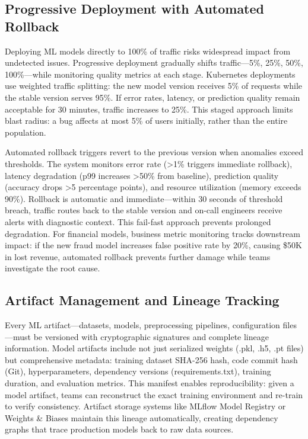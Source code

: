 \subsection{Progressive Deployment with Automated Rollback}

Deploying ML models directly to 100\% of traffic risks widespread impact from undetected issues. Progressive deployment gradually shifts traffic---5\%, 25\%, 50\%, 100\%---while monitoring quality metrics at each stage. Kubernetes deployments use weighted traffic splitting: the new model version receives 5\% of requests while the stable version serves 95\%. If error rates, latency, or prediction quality remain acceptable for 30 minutes, traffic increases to 25\%. This staged approach limits blast radius: a bug affects at most 5\% of users initially, rather than the entire population.

Automated rollback triggers revert to the previous version when anomalies exceed thresholds. The system monitors error rate (>1\% triggers immediate rollback), latency degradation (p99 increases >50\% from baseline), prediction quality (accuracy drops >5 percentage points), and resource utilization (memory exceeds 90\%). Rollback is automatic and immediate---within 30 seconds of threshold breach, traffic routes back to the stable version and on-call engineers receive alerts with diagnostic context. This fail-fast approach prevents prolonged degradation. For financial models, business metric monitoring tracks downstream impact: if the new fraud model increases false positive rate by 20\%, causing \$50K in lost revenue, automated rollback prevents further damage while teams investigate the root cause.

\subsection{Artifact Management and Lineage Tracking}

Every ML artifact---datasets, models, preprocessing pipelines, configuration files---must be versioned with cryptographic signatures and complete lineage information. Model artifacts include not just serialized weights (.pkl, .h5, .pt files) but comprehensive metadata: training dataset SHA-256 hash, code commit hash (Git), hyperparameters, dependency versions (requirements.txt), training duration, and evaluation metrics. This manifest enables reproducibility: given a model artifact, teams can reconstruct the exact training environment and re-train to verify consistency. Artifact storage systems like MLflow Model Registry or Weights \& Biases maintain this lineage automatically, creating dependency graphs that trace production models back to raw data sources.

